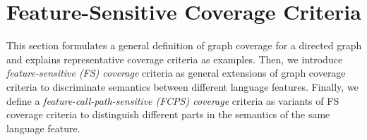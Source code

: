 \section{Feature-Sensitive Coverage Criteria}\label{sec:fscov}

This section formulates a general definition of graph coverage
for a directed graph and explains representative coverage criteria as examples.
Then, we introduce \textit{feature-sensitive (FS) coverage} criteria as general
extensions of graph coverage criteria to discriminate semantics between
different language features.
Finally, we define a \textit{feature-call-path-sensitive (FCPS) coverage}
criteria as variants of FS coverage criteria to distinguish different parts in
the semantics of the same language feature.




